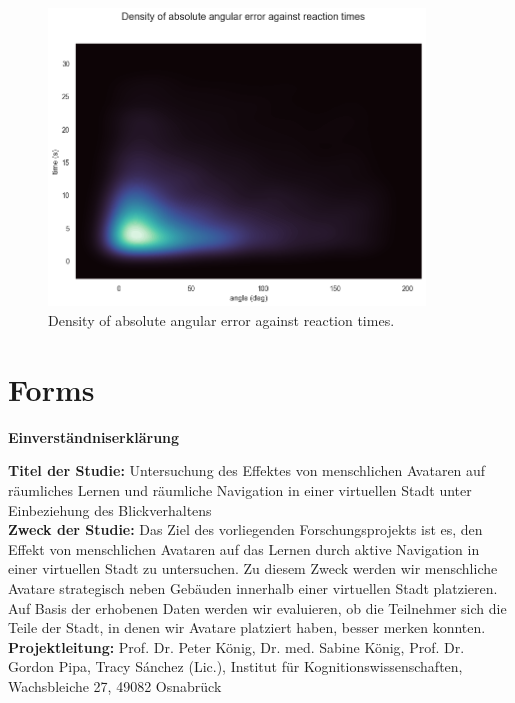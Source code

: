 \begin{figure}[!htb]
	\centering
	\includegraphics[width=100mm]{figures/density_angular_error_reaction_time_23.png}
	\caption[Density of absolute angular error against reaction times]{Density of absolute angular error against reaction times.}
	\label{fig:density_angular_error_reaction_time_23}
\end{figure}


\chapter{Forms}\label{appx:forms}

\begin{center}
	\LARGE{\textbf{Einverständniserklärung}} \\
\end{center}


\textbf{Titel der Studie:} Untersuchung des Effektes von menschlichen Avataren auf räumliches Lernen und räumliche Navigation in einer virtuellen Stadt unter Einbeziehung des Blickverhaltens \\

\textbf{Zweck der Studie:} Das Ziel des vorliegenden Forschungsprojekts ist es, den Effekt von menschlichen Avataren auf das Lernen durch aktive Navigation in einer virtuellen Stadt zu untersuchen. Zu diesem Zweck werden wir menschliche Avatare strategisch neben Gebäuden innerhalb einer virtuellen Stadt platzieren. Auf Basis der erhobenen Daten werden wir evaluieren, ob die Teilnehmer sich die Teile der Stadt, in denen wir Avatare platziert haben, besser merken konnten. \\

\textbf{Projektleitung:} Prof. Dr. Peter König, Dr. med. Sabine König, Prof. Dr. Gordon Pipa, Tracy Sánchez (Lic.), Institut für Kognitionswissenschaften, Wachsbleiche 27, 49082 Osnabrück \\


